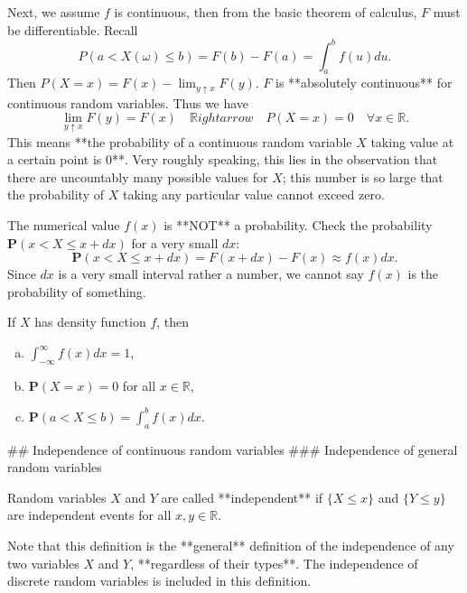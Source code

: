 Next, we assume $f$ is continuous, then from the basic theorem of calculus, $F$ must be differentiable. Recall 
\begin{equation*}
    P(a < X(\omega) \leq b) = F(b) - F(a) = \int_{a}^b f(u)du.
\end{equation*}
Then $P(X=x) = F(x) - \lim_{y \uparrow x} F(y)$. $F$ is **absolutely continuous** for continuous random variables. Thus we have
\begin{equation*}
    \lim_{y\uparrow x} F(y) = F(x) \quad \mathbb{R}ightarrow \quad P(X=x) = 0 \quad \forall x\in\mathbb{R}.
\end{equation*}
This means **the probability of a continuous random variable $X$ taking value at a certain point is 0**. Very roughly speaking, this lies in the observation that there are uncountably many possible values for $X$; this number is so large that the probability of $X$ taking any particular value cannot exceed zero. 

The numerical value $f(x)$ is **NOT** a probability. Check the probability $\mathbf{P}(x < X \leq x + dx)$ for a very small $dx$:
\begin{equation*}
    \mathbf{P}(x < X \leq x + dx) = F(x + dx) - F(x) \approx f(x) dx. 
\end{equation*}
Since $dx$ is a very small interval rather a number, we cannot say $f(x)$ is the probability of something.

\begin{lemma}
If $X$ has density function $f$, then
\begin{enumerate}[(a)]
    \item $\int_{-\infty}^\infty f(x)dx = 1$,
    \item $\mathbf{P}(X=x) = 0$ for all $x \in \mathbb{R}$,
    \item $\mathbf{P}(a < X \leq b) = \int_a^b f(x)dx$.
\end{enumerate}
\end{lemma}

## Independence of continuous random variables
### Independence of general random variables
\begin{definition}
Random variables $X$ and $Y$ are called **independent** if $\{ X \leq x\}$ and $\{Y \leq y\}$ are independent events for all $x, y \in \mathbb{R}$. 
\end{definition}
Note that this definition is the **general** definition of the independence of any two variables $X$ and $Y$, **regardless of their types**. The independence of discrete random variables is included in this definition. 

